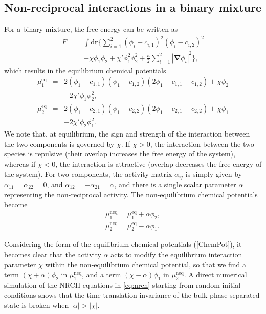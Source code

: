 \subsection{Non-reciprocal interactions in a binary mixture}
For a binary mixture, the free energy can be written as
\begin{eqnarray}
F &=&  \int \mathrm{d}\bm{r} \bigg\{ \sum_{i=1}^{2} (\phi_i-c_{i,1})^2(\phi_i-c_{i,2})^2  \nonumber \\ 
&& + \chi \phi_1 \phi_2 + \chi' \phi_1^2 \phi_2^2  
+ 
    \frac{\kappa}{2}
    \sum_{i=1}^{2} |\bm{\nabla} \phi_i|^2  \bigg\},
\label{FreeEnergy2}
\end{eqnarray}
which results in the equilibrium chemical potentials
\begin{eqnarray}
\mu_1^\mathrm{eq} &=& 
    2
(\phi_1 - c_{1,1})(\phi_1 - c_{1,2})(2\phi_1 - c_{1,1}- c_{1,2}) + \chi \phi_2 \nonumber \\
&& + 2 \chi' \phi_1 \phi_2^2, \nonumber \\
\mu_2^\mathrm{eq} &=& 
    2
(\phi_1 - c_{2,1})(\phi_1 - c_{2,2})(2\phi_1 - c_{2,1}- c_{2,2})  + \chi \phi_1 \nonumber \\
&& + 2 \chi' \phi_2 \phi_1^2.
\label{ChemPot}
\end{eqnarray}
We note that, at equilibrium, the sign and strength of the interaction between the two components is governed by $\chi$. If $\chi>0$, the interaction between the two species is repulsive (their overlap increases the free energy of the system), whereas if $\chi<0$, the interaction is attractive (overlap decreases the free energy of the system). For two components, the activity matrix $\alpha_{ij}$ is simply given by $\alpha_{11}=\alpha_{22}=0$, and $\alpha_{12}=-\alpha_{21}=\alpha$, and there is a single scalar parameter $\alpha$ representing the non-reciprocal activity. The non-equilibrium chemical potentials become 
\begin{eqnarray}
 \mu^\mathrm{neq}_1 = \mu_1^\mathrm{eq} + \alpha \phi_2, \nonumber \\
 \mu^\mathrm{neq}_2 = \mu_2^\mathrm{eq} - \alpha \phi_1.
 \label{ChemPot2}
\end{eqnarray}

Considering the form of the equilibrium chemical potentials (\ref{ChemPot}), it becomes clear that the activity $\alpha$ acts to modify the equilibrium interaction parameter $\chi$ within the non-equilibrium chemical potential, so that we find a term $(\chi + \alpha) \phi_2$ in $\mu^\mathrm{neq}_1$, and a term $(\chi - \alpha) \phi_1$ in $\mu^\mathrm{neq}_2$. A direct numerical simulation of the NRCH equations in \eqref{eq:nrch} starting from random initial conditions shows that the time translation invariance of the bulk-phase separated state is broken when $|\alpha|>|\chi|$. 

